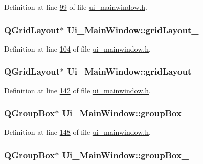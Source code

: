 Definition at line \hyperlink{a00052_source_l00099}{99} of file \hyperlink{a00052_source}{ui\+\_\+mainwindow.\+h}.

\hypertarget{a00027_a20728ed83bf740332bd908ea3e15ace6}{
\subsubsection[{grid\+Layout\+\_\+8}]{\setlength{\rightskip}{0pt plus 5cm}Q\+Grid\+Layout$\ast$ Ui\+\_\+\+Main\+Window\+::grid\+Layout\+\_}}\label{a00027_a20728ed83bf740332bd908ea3e15ace6}


Definition at line \hyperlink{a00052_source_l00104}{104} of file \hyperlink{a00052_source}{ui\+\_\+mainwindow.\+h}.

\hypertarget{a00027_aa03590dd5aac614bf717649a544c015f}{
\subsubsection[{grid\+Layout\+\_\+9}]{\setlength{\rightskip}{0pt plus 5cm}Q\+Grid\+Layout$\ast$ Ui\+\_\+\+Main\+Window\+::grid\+Layout\+\_}}\label{a00027_aa03590dd5aac614bf717649a544c015f}


Definition at line \hyperlink{a00052_source_l00142}{142} of file \hyperlink{a00052_source}{ui\+\_\+mainwindow.\+h}.

\hypertarget{a00027_a417cb0342ea95d3fe5f7e3f4feeb6515}{
\subsubsection[{group\+Box\+\_\+11}]{\setlength{\rightskip}{0pt plus 5cm}Q\+Group\+Box$\ast$ Ui\+\_\+\+Main\+Window\+::group\+Box\+\_}}\label{a00027_a417cb0342ea95d3fe5f7e3f4feeb6515}


Definition at line \hyperlink{a00052_source_l00148}{148} of file \hyperlink{a00052_source}{ui\+\_\+mainwindow.\+h}.

\hypertarget{a00027_af55cd87dbe0f7d42980b1012f15cae2d}{
\subsubsection[{group\+Box\+\_\+12}]{\setlength{\rightskip}{0pt plus 5cm}Q\+Group\+Box$\ast$ Ui\+\_\+\+Main\+Window\+::group\+Box\+\_}}\label{a00027_af55cd87dbe0f7d42980b1012f15cae2d}


